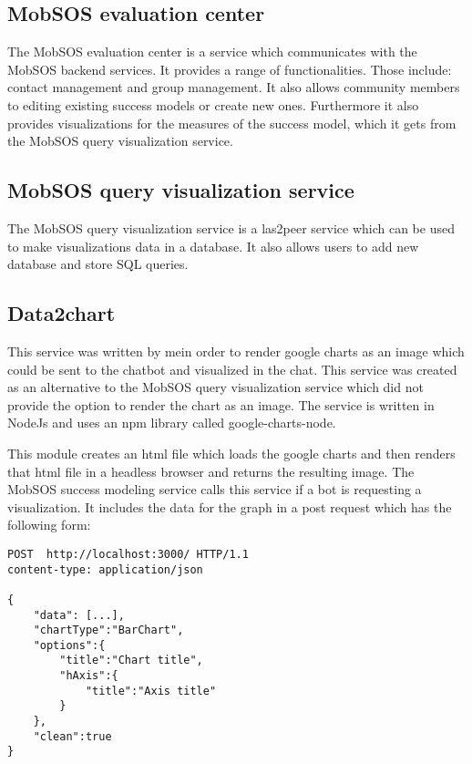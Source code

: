 \subsection{MobSOS evaluation center}
The MobSOS evaluation center is a service which communicates with the MobSOS backend services. It provides a range of functionalities. Those include: contact management and group management. 
It also allows community members to editing existing success models or create new ones.
Furthermore it also provides visualizations for the measures of the success model, which it gets from the MobSOS query visualization service.

\subsection{MobSOS query visualization service}
The MobSOS query visualization service is a las2peer service which can be used to make visualizations data in a database. It also allows users to add new database and store SQL queries.

\subsection{Data2chart}
This service was written by me\footnotemark in order to render google charts as an image which could be sent to the chatbot and visualized in the chat. This service was created as an alternative to the MobSOS query visualization service which did not provide the option to render the chart as an image. 
The service is written in NodeJs and uses an npm library called google-charts-node\footnotemark.

This module creates an html file which loads the google charts and then renders that html file in a headless browser \footnotemark and returns the resulting image.
The MobSOS success modeling service calls this service if a bot is requesting a visualization. It includes the data for the graph in a post request which has the following form:

\begin{lstlisting}
POST  http://localhost:3000/ HTTP/1.1
content-type: application/json

{
    "data": [...],
    "chartType":"BarChart",
    "options":{
        "title":"Chart title",
        "hAxis":{
            "title":"Axis title"
        }
    },
    "clean":true 
}
\end{lstlisting}


